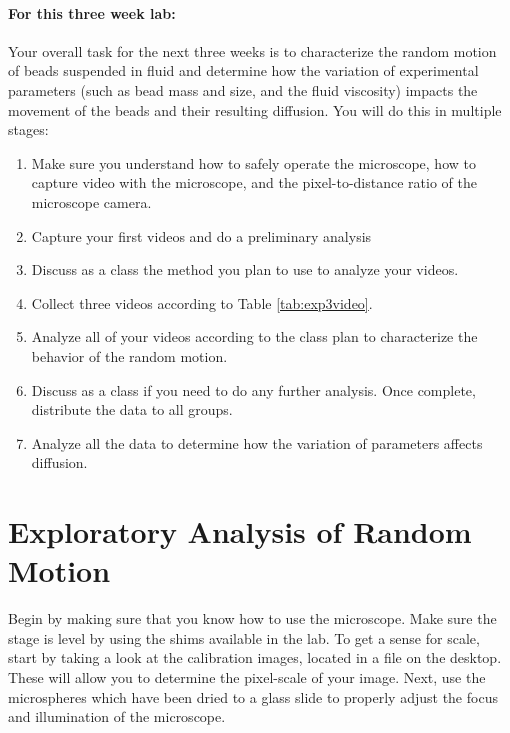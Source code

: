 \paragraph{For this three week lab:} Your overall task for the next three weeks is to characterize the random motion of beads suspended in fluid and determine how the variation of experimental parameters (such as bead mass and size, and the fluid viscosity) impacts the movement of the beads and their resulting diffusion.
You will do this in multiple stages:
\begin{enumerate}
\item Make sure you understand how to safely operate the microscope, how to capture video with the microscope, and the pixel-to-distance ratio of the microscope camera.
\item Capture your first videos and do a preliminary analysis
\item Discuss as a class the method you plan to use to analyze your videos.
\item Collect three videos according to Table \ref{tab:exp3video}.
\item Analyze all of your videos according to the class plan to characterize the behavior of the random motion.
\item Discuss as a class if you need to do any further analysis. Once complete, distribute the data to all groups.
\item Analyze all the data to determine how the variation of parameters affects diffusion.
\end{enumerate}

\section{Exploratory Analysis of Random Motion}
Begin by making sure that you know how to use the microscope.
Make sure the stage is level by using the shims available in the lab.
To get a sense for scale, start by taking a look at the calibration images, located in a file on the desktop.
These will allow you to determine the pixel-scale of your image.
Next, use the microspheres which have been dried to a glass slide to properly adjust the focus and illumination of the microscope.
